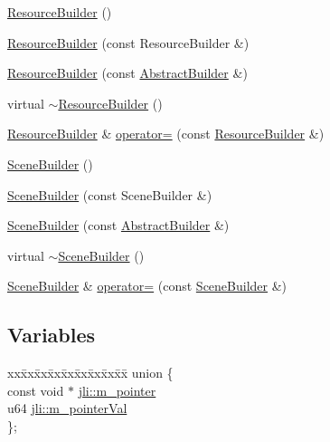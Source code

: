 \begin{DoxyCompactItemize}
\hyperlink{namespacejli_ae9f9f7477ddfe0b9d4ac195927e749b4}{Resource\+Builder} ()
\item 
\hyperlink{namespacejli_ac25c61dfb7fd3cd0172ccf6a5d6d9598}{Resource\+Builder} (const Resource\+Builder \&)
\item 
\hyperlink{namespacejli_a2f0f2d3abddab36a2e632d5fe25bdea7}{Resource\+Builder} (const \hyperlink{classjli_1_1_abstract_builder}{Abstract\+Builder} \&)
\item 
virtual \hyperlink{namespacejli_a7e46cbc7bc71f3c538261e41816e87b0}{$\sim$\+Resource\+Builder} ()
\item 
\hyperlink{namespacejli_ae9f9f7477ddfe0b9d4ac195927e749b4}{Resource\+Builder} \& \hyperlink{namespacejli_a544c167a86203fa931b358dc2e77df53}{operator=} (const \hyperlink{namespacejli_ae9f9f7477ddfe0b9d4ac195927e749b4}{Resource\+Builder} \&)
\item 
\hyperlink{namespacejli_a416f25c3329cd3e760e1a184b62e7223}{Scene\+Builder} ()
\item 
\hyperlink{namespacejli_a08327fcbf8005b89aa48e20217b34adc}{Scene\+Builder} (const Scene\+Builder \&)
\item 
\hyperlink{namespacejli_a2f38a2d72a581791a6deeebca04d5daf}{Scene\+Builder} (const \hyperlink{classjli_1_1_abstract_builder}{Abstract\+Builder} \&)
\item 
virtual \hyperlink{namespacejli_a99a07c08fdc61e92c99f5a47bc3430fa}{$\sim$\+Scene\+Builder} ()
\item 
\hyperlink{namespacejli_a416f25c3329cd3e760e1a184b62e7223}{Scene\+Builder} \& \hyperlink{namespacejli_ab76ae2c8b17665d1e78209f9c76653e8}{operator=} (const \hyperlink{namespacejli_a416f25c3329cd3e760e1a184b62e7223}{Scene\+Builder} \&)
\end{DoxyCompactItemize}
\subsection*{Variables}
\begin{DoxyCompactItemize}
\item 
\begin{tabbing}
xx\=xx\=xx\=xx\=xx\=xx\=xx\=xx\=xx\=\kill
union \{\\
\>const void $\ast$ \hyperlink{namespacejli_ada77c3ed1019f3c21042f228b25756d7}{jli::m\_pointer}\\
\>u64 \hyperlink{namespacejli_a33c35463a7c7fe6bdede0f192fe9d7c6}{jli::m\_pointerVal}\\
\}; \\

\end{tabbing}\end{DoxyCompactItemize}


